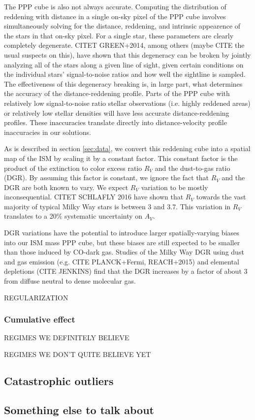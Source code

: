 The PPP cube is also not always accurate. Computing the distribution of reddening with distance in a single on-sky pixel of the PPP cube involves simultaneously solving for the distance, reddening, and intrinsic appearence of the stars in that on-sky pixel. For a single star, these parameters are clearly completely degenerate. CITET GREEN+2014, among others (maybe CITE the usual suspects on this), have shown that this degeneracy can be broken by jointly analyzing all of the stars along a given line of sight, given certain conditions on the individual stars' signal-to-noise ratios and how well the sightline is sampled. The effectiveness of this degeneracy breaking is, in large part, what determines the accuracy of the distance-reddening profile. Parts of the PPP cube with relatively low signal-to-noise ratio stellar observations (i.e. highly reddened areas) or relatively low stellar densities will have less accurate distance-reddening profiles. These inaccuracies translate directly into distance-velocity profile inaccuracies in our solutions. 

As is described in section \ref{sec:data}, we convert this reddening cube into a spatial map of the ISM by scaling it by a constant factor. This constant factor is the product of the extinction to color excess ratio $R_V$ and the dust-to-gas ratio (DGR). By assuming this factor is constant, we ignore the fact that $R_V$ and the DGR are both known to vary. We expect $R_V$ variation to be mostly inconsequential. CITET SCHLAFLY 2016 have shown that $R_V$ towards the vast majority of typical Milky Way stars is between 3 and 3.7. This variation in $R_V$ translates to a 20\% systematic uncertainty on $A_V$.

DGR variations have the potential to introduce larger spatially-varying biases into our ISM mass PPP cube, but these biases are still expected to be smaller than those induced by CO-dark gas. Studies of the Milky Way DGR using dust and gas emission (e.g. CITE PLANCK+Fermi, REACH+2015) and elemental depletions (CITE JENKINS) find that the DGR increases by a factor of about 3 from diffuse neutral to dense molecular gas. 

REGULARIZATION

\subsubsection{Cumulative effect}
REGIMES WE DEFINITELY BELIEVE

REGIMES WE DON'T QUITE BELIEVE YET

\subsection{Catastrophic outliers}
\label{sec:discussion-catastrophic}

\subsection{Something else to talk about}